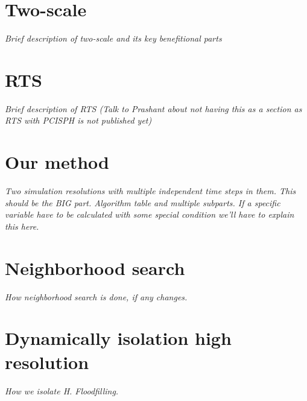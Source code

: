 \documentclass[../main.tex]{subfiles}
\begin{document}
\section{Two-scale}
\textit{Brief description of two-scale and its key benefitional parts}


\section{RTS}
\textit{Brief description of RTS (Talk to Prashant about not having this as a section as RTS with PCISPH is not published yet)}


\section{Our method}
\textit{Two simulation resolutions with multiple independent time steps in them. This should be the BIG part. Algorithm table and multiple subparts. If a specific variable have to be calculated with some special condition we'll have to explain this here.}


\section{Neighborhood search}
\textit{How neighborhood search is done, if any changes.}


\section{Dynamically isolation high resolution}
\textit{How we isolate H. Floodfilling.}
\end{document}
